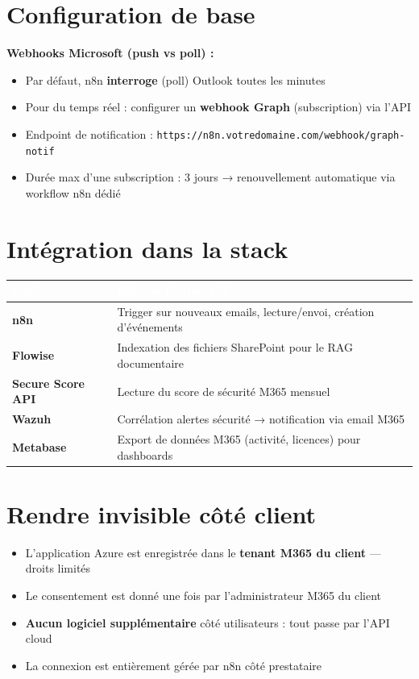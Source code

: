 \documentclass[11pt, a4paper]{article}
\begin{document}
\section{Configuration de base}

\textbf{Webhooks Microsoft (push vs poll) :}
\begin{itemize}
  \item Par défaut, n8n \textbf{interroge} (poll) Outlook toutes les minutes
  \item Pour du temps réel : configurer un \textbf{webhook Graph} (subscription) via l'API
  \item Endpoint de notification : \texttt{https://n8n.votredomaine.com/webhook/graph-notif}
  \item Durée max d'une subscription : 3 jours → renouvellement automatique via workflow n8n dédié
\end{itemize}

\section{Intégration dans la stack}

\begin{center}
\renewcommand{\arraystretch}{1.4}
\begin{tabularx}{\linewidth}{>{\bfseries}p{2.8cm} X}
\toprule
\rowcolor{tabheader}
\textcolor{white}{\textbf{Outil}} & \textcolor{white}{\textbf{Rôle de Graph API}} \\
\midrule
n8n & Trigger sur nouveaux emails, lecture/envoi, création d'événements \\
\rowcolor{rowgray}
Flowise & Indexation des fichiers SharePoint pour le RAG documentaire \\
Secure Score API & Lecture du score de sécurité M365 mensuel \\
\rowcolor{rowgray}
Wazuh & Corrélation alertes sécurité → notification via email M365 \\
Metabase & Export de données M365 (activité, licences) pour dashboards \\
\bottomrule
\end{tabularx}
\end{center}

\section{Rendre invisible côté client}

\begin{itemize}
  \item L'application Azure est enregistrée dans le \textbf{tenant M365 du client} — droits limités
  \item Le consentement est donné une fois par l'administrateur M365 du client
  \item \textbf{Aucun logiciel supplémentaire} côté utilisateurs : tout passe par l'API cloud
  \item La connexion est entièrement gérée par n8n côté prestataire
\end{itemize}
\end{document}
